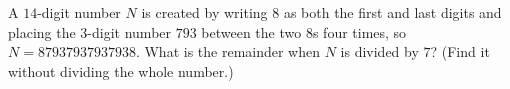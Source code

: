 A $14$-digit number $N$ is created by writing $8$ as both the first and last digits and placing the $3$-digit number $793$ between the two $8$s four times, so $N=87937937937938$. What is the remainder when $N$ is divided by $7$? (Find it without dividing the whole number.)

